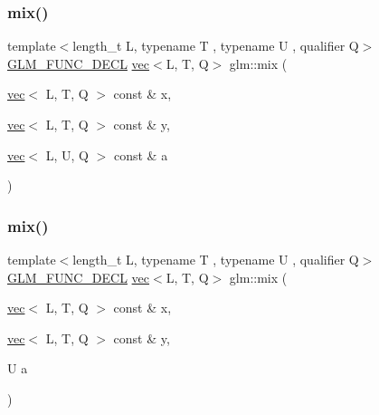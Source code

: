\subsubsection{\texorpdfstring{mix()}{mix()}\hspace{0.1cm}{\footnotesize\ttfamily [2/3]}}
{\footnotesize\ttfamily template$<$length\+\_\+t L, typename T , typename U , qualifier Q$>$ \\
\hyperlink{setup_8hpp_ab2d052de21a70539923e9bcbf6e83a51}{G\+L\+M\+\_\+\+F\+U\+N\+C\+\_\+\+D\+E\+CL} \hyperlink{structglm_1_1vec}{vec}$<$L, T, Q$>$ glm\+::mix (\begin{DoxyParamCaption}\item[{\hyperlink{structglm_1_1vec}{vec}$<$ L, T, Q $>$ const \&}]{x,  }\item[{\hyperlink{structglm_1_1vec}{vec}$<$ L, T, Q $>$ const \&}]{y,  }\item[{\hyperlink{structglm_1_1vec}{vec}$<$ L, U, Q $>$ const \&}]{a }\end{DoxyParamCaption})}

\mbox{\label{group__core__func__common_gac18f8fdaae00f0a27a4d01d3aa507aad}} 
\subsubsection{\texorpdfstring{mix()}{mix()}\hspace{0.1cm}{\footnotesize\ttfamily [3/3]}}
{\footnotesize\ttfamily template$<$length\+\_\+t L, typename T , typename U , qualifier Q$>$ \\
\hyperlink{setup_8hpp_ab2d052de21a70539923e9bcbf6e83a51}{G\+L\+M\+\_\+\+F\+U\+N\+C\+\_\+\+D\+E\+CL} \hyperlink{structglm_1_1vec}{vec}$<$L, T, Q$>$ glm\+::mix (\begin{DoxyParamCaption}\item[{\hyperlink{structglm_1_1vec}{vec}$<$ L, T, Q $>$ const \&}]{x,  }\item[{\hyperlink{structglm_1_1vec}{vec}$<$ L, T, Q $>$ const \&}]{y,  }\item[{U}]{a }\end{DoxyParamCaption})}

\mbox{\label{group__core__func__common_ga12201563ef902e3b07e0d1d7656efdb1}} 
